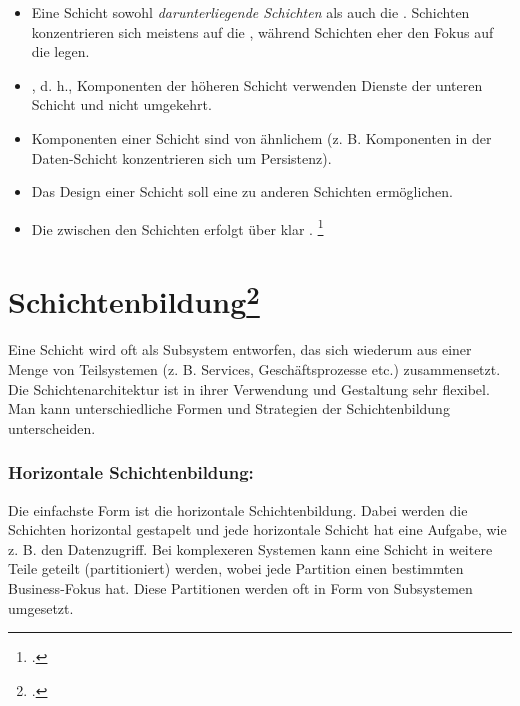 \documentclass{lehramt-informatik}
\begin{document}
\begin{itemize}
\item Eine Schicht  sowohl \emph{darunterliegende
Schichten} als auch die . 
Schichten konzentrieren sich meistens auf die , während
 Schichten eher den Fokus auf die
 legen.

\item {}, d. h., Komponenten der höheren
Schicht verwenden Dienste der unteren Schicht und nicht umgekehrt.

\item Komponenten  einer Schicht sind von ähnlichem
 (z. B. Komponenten in der Daten-Schicht
konzentrieren sich um Persistenz).

\item Das Design einer Schicht soll eine  zu
anderen Schichten ermöglichen.

\item Die  zwischen den Schichten erfolgt über klar
.
\footcite[Seite 211]{schatten}
\end{itemize}

%

\section{Schichtenbildung\footcite[Seite 11]{sosy:fs:4}}

Eine Schicht wird oft als Subsystem entworfen, das sich wiederum aus
einer Menge von Teilsystemen (z. B. Services, Geschäftsprozesse etc.)
zusammensetzt. Die Schichtenarchitektur ist in ihrer Verwendung und
Gestaltung sehr flexibel. Man kann unterschiedliche Formen und
Strategien der Schichtenbildung unterscheiden.

\subsubsection{Horizontale Schichtenbildung:}

Die einfachste Form ist die horizontale Schichtenbildung. Dabei werden
die Schichten horizontal gestapelt und jede horizontale Schicht hat
eine Aufgabe, wie z. B. den Datenzugriff. Bei komplexeren Systemen
kann eine Schicht in weitere Teile geteilt (partitioniert) werden,
wobei jede Partition einen bestimmten Business-Fokus hat. Diese
Partitionen werden oft in Form von Subsystemen umgesetzt.
\end{document}
